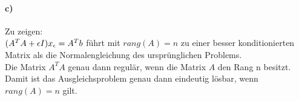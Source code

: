 \paragraph*{c)}
Zu zeigen:\\
$(A^TA + \epsilon I)x_\epsilon = A^Tb$ führt mit $rang(A) = n$ zu einer besser konditionierten Matrix als die Normalengleichung des ursprünglichen Problems.\\
\newline
Die Matrix $A^TA$ genau dann regulär, wenn die Matrix $A$ den Rang n besitzt. Damit ist das Ausgleichsproblem genau dann eindeutig lösbar, wenn $rang(A) =n$ gilt.
